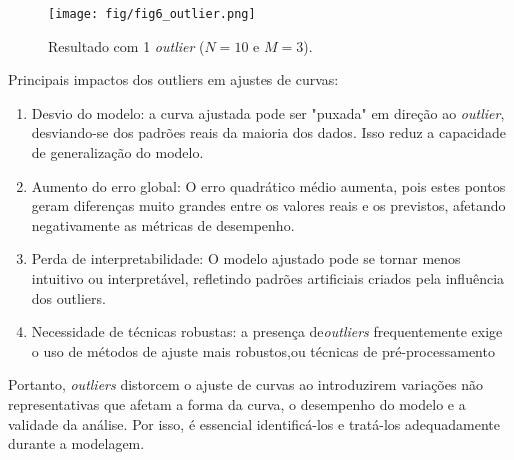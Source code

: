 \documentclass{article}
\begin{document}
\begin{itemize}
  	       \begin{figure}[ht]
  	       	\centering %
  	       	\texttt{[image: fig/fig6\_outlier.png]} %
  	       	\caption{Resultado com 1 \textit{outlier} ($N=10$ e $M=3$).} %
  	       	\label{fig8} %
  	       \end{figure}
  	       
  	       Principais impactos dos outliers em ajustes de curvas:
  	       
  	       \begin{enumerate}
  	       	\item Desvio do modelo: a curva ajustada pode ser "puxada" em direção ao \textit{outlier}, desviando-se dos padrões reais da maioria dos dados. Isso reduz a capacidade de generalização do modelo.
  	       	
  	       	\item Aumento do erro global: O erro quadrático médio aumenta, pois estes pontos geram diferenças muito grandes entre os valores reais e os previstos, afetando negativamente as métricas de desempenho.
  	       	
  	       	\item Perda de interpretabilidade: O modelo ajustado pode se tornar menos intuitivo ou interpretável, refletindo padrões artificiais criados pela influência dos outliers.
  	       	
  	       	\item Necessidade de técnicas robustas: a presença de\textit{outliers} frequentemente exige o uso de métodos de ajuste mais robustos,ou técnicas de pré-processamento
  	       	
  	       \end{enumerate}
  	  
  	   Portanto, \textit{outliers} distorcem o ajuste de curvas ao introduzirem variações não representativas que afetam a forma da curva, o desempenho do modelo e a validade da análise. Por isso, é essencial identificá-los e tratá-los adequadamente durante a modelagem.
  \end{itemize}



\end{document}
